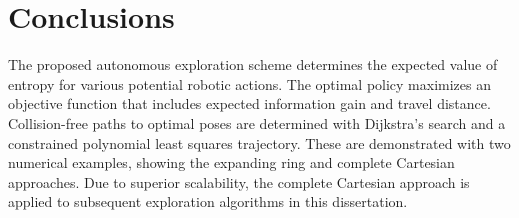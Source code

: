 
\section{Conclusions}

The proposed autonomous exploration scheme determines the expected value of entropy for various potential robotic actions. The optimal policy maximizes an objective function that includes expected information gain and travel distance. Collision-free paths to optimal poses are determined with Dijkstra's search and a constrained polynomial least squares trajectory. These are demonstrated with two numerical examples, showing the expanding ring and complete Cartesian approaches. Due to superior scalability, the complete Cartesian approach is applied to subsequent exploration algorithms in this dissertation.
